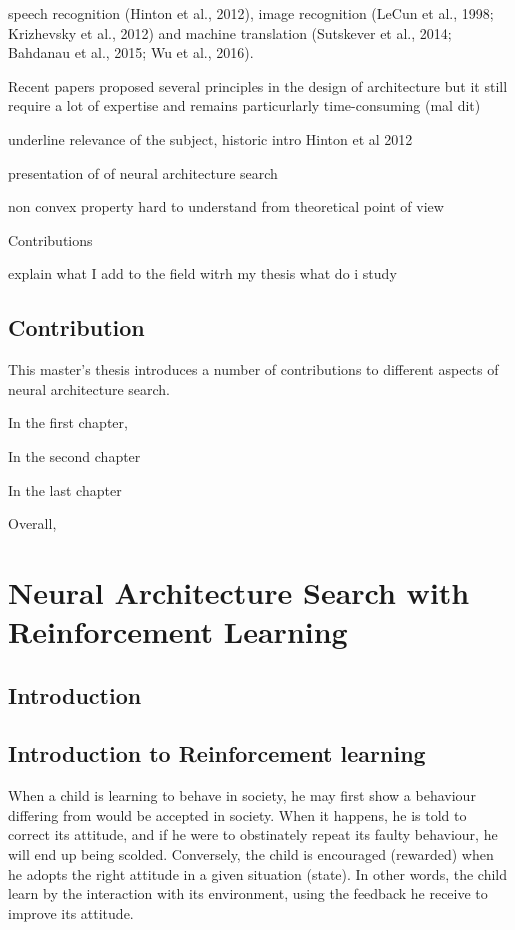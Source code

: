 \documentclass[11pt, onecolumn, a4paper]{report}
\begin{document}
speech recognition (Hinton et al., 2012), image recognition (LeCun et al., 1998;
Krizhevsky et al., 2012) and machine translation (Sutskever et al., 2014; Bahdanau et al., 2015; Wu
et al., 2016).

Recent papers proposed several principles in the design of architecture but it still require a lot of expertise and remains particurlarly time-consuming (mal dit) 

underline relevance of the subject, historic intro
 Hinton et al 2012

presentation of of neural architecture search


non convex property hard to understand from theoretical point of view

Contributions

explain what I add to the field witrh my thesis
what do i study


\section*{Contribution}

This master’s thesis introduces a number of contributions to different aspects of neural architecture search.

In the first chapter,

In the second chapter

In the last chapter

Overall,


\chapter{Neural Architecture Search with Reinforcement Learning}

\section{Introduction}

\section{Introduction to Reinforcement learning}

When a child is learning to behave in society, he may first show a behaviour differing from would be accepted in society. When it happens, he is told to correct its attitude, and if he were to obstinately repeat its faulty behaviour, he will end up being scolded. Conversely, the child is encouraged (rewarded) when he adopts the right attitude in a given situation (state). In other words, the child learn by the interaction with its environment, using the feedback he receive to improve its attitude.\\
\end{document}

